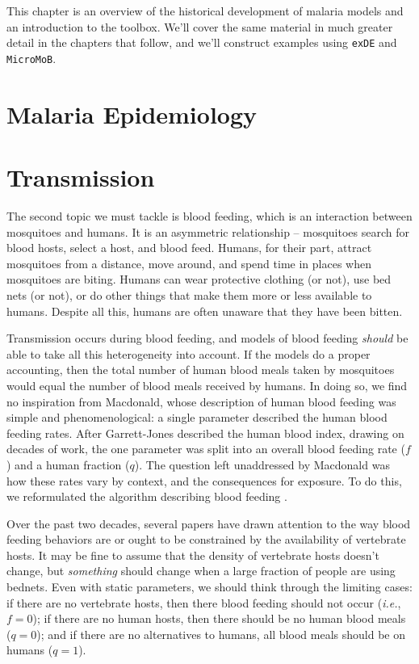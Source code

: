 \documentclass[
]{book}
\begin{document}
This chapter is an overview of the historical development of malaria models and an introduction to the toolbox. We'll cover the same material in much greater detail in the chapters that follow, and we'll construct examples using \texttt{exDE} and \texttt{MicroMoB}.

\section{Malaria Epidemiology}\label{malaria-epidemiology-1}

\section{Transmission}\label{transmission}

The second topic we must tackle is blood feeding, which is an interaction between mosquitoes and humans. It is an asymmetric relationship -- mosquitoes search for blood hosts, select a host, and blood feed. Humans, for their part, attract mosquitoes from a distance, move around, and spend time in places when mosquitoes are biting. Humans can wear protective clothing (or not), use bed nets (or not), or do other things that make them more or less available to humans. Despite all this, humans are often unaware that they have been bitten.

Transmission occurs during blood feeding, and models of blood feeding \emph{should} be able to take all this heterogeneity into account. If the models do a proper accounting, then the total number of human blood meals taken by mosquitoes would equal the number of blood meals received by humans. In doing so, we find no inspiration from Macdonald, whose description of human blood feeding was simple and phenomenological: a single parameter described the human blood feeding rates. After Garrett-Jones described the human blood index, drawing on decades of work, the one parameter was split into an overall blood feeding rate (\(f\)) and a human fraction (\(q\)). The question left unaddressed by Macdonald was how these rates vary by context, and the consequences for exposure. To do this, we reformulated the algorithm describing blood feeding \autocite{WuSL2023SpatialDynamics}.

Over the past two decades, several papers have drawn attention to the way blood feeding behaviors are or ought to be constrained by the availability of vertebrate hosts. It may be fine to assume that the density of vertebrate hosts doesn't change, but \emph{something} should change when a large fraction of people are using bednets. Even with static parameters, we should think through the limiting cases: if there are no vertebrate hosts, then there blood feeding should not occur (\emph{i.e.}, \(f=0\)); if there are no human hosts, then there should be no human blood meals (\(q=0\)); and if there are no alternatives to humans, all blood meals should be on humans (\(q=1\)).
\end{document}
